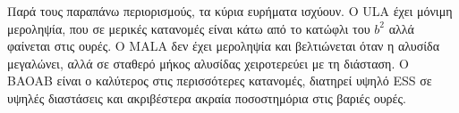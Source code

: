 Παρά τους παραπάνω περιορισμούς, τα κύρια ευρήματα ισχύουν. Ο ULA έχει
μόνιμη μεροληψία, που σε μερικές κατανομές είναι κάτω από το κατώφλι του $b^2$ αλλά
φαίνεται στις ουρές. Ο MALA δεν έχει μεροληψία και βελτιώνεται όταν η αλυσίδα
μεγαλώνει, αλλά σε σταθερό μήκος αλυσίδας χειροτερεύει με τη διάσταση. Ο BAOAB είναι
ο καλύτερος στις περισσότερες κατανομές, διατηρεί υψηλό ESS σε υψηλές διαστάσεις και
ακριβέστερα ακραία ποσοστημόρια στις βαριές ουρές.